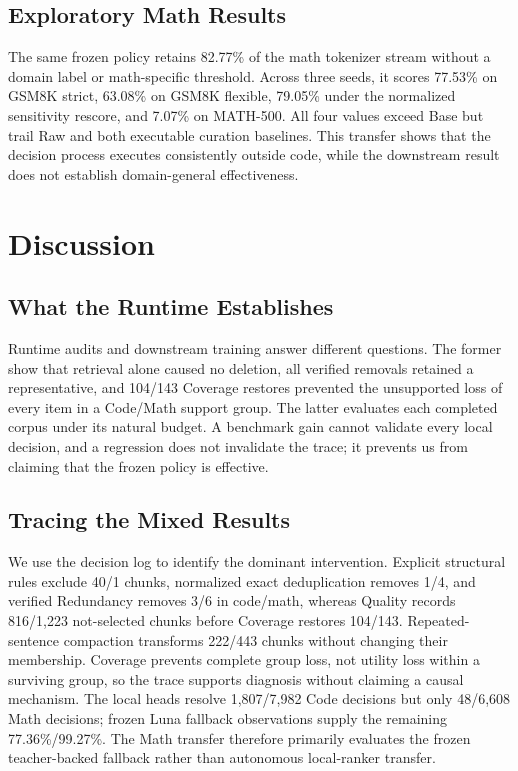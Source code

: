 \documentclass[conference]{IEEEtran}
\begin{document}
\subsection{Exploratory Math Results}
The same frozen policy retains 82.77\% of the math tokenizer stream without a
domain label or math-specific threshold. Across three seeds, it scores 77.53\%
on GSM8K strict, 63.08\% on GSM8K flexible, 79.05\% under the normalized
sensitivity rescore, and 7.07\% on MATH-500. All four values exceed Base but
trail Raw and both executable curation baselines. This transfer shows that the
decision process executes consistently outside code, while the downstream
result does not establish domain-general effectiveness.

\section{Discussion}
\subsection{What the Runtime Establishes}
Runtime audits and downstream training answer different questions. The former
show that retrieval alone caused no deletion, all verified removals retained a
representative, and 104/143 Coverage restores prevented the unsupported loss of
every item in a Code/Math support group.
The latter evaluates each completed corpus under its natural budget. A
benchmark gain cannot validate every local decision, and a regression does not
invalidate the trace; it prevents us from claiming that the frozen policy is effective.

\subsection{Tracing the Mixed Results}
We use the decision log to identify the dominant intervention. Explicit structural
rules exclude 40/1 chunks, normalized exact deduplication removes 1/4, and
verified Redundancy removes 3/6 in code/math,
whereas Quality records 816/1,223 not-selected chunks before Coverage restores
104/143. Repeated-sentence compaction transforms 222/443 chunks without
changing their membership. Coverage prevents complete group loss, not utility
loss within a surviving group, so the trace supports diagnosis without claiming
a causal mechanism.
The local heads resolve 1,807/7,982 Code decisions but only 48/6,608 Math
decisions; frozen Luna fallback observations supply the remaining
77.36\%/99.27\%. The Math transfer therefore primarily evaluates the frozen
teacher-backed fallback rather than autonomous local-ranker transfer.
\end{document}

